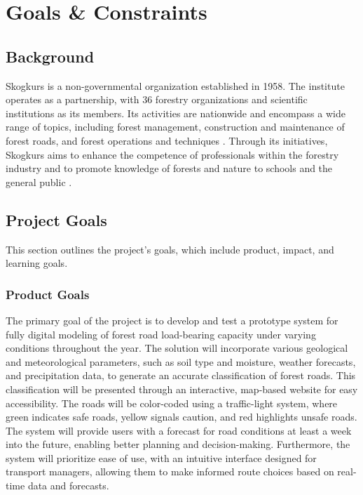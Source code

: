 \section{Goals \& Constraints}
\subsection{Background}
Skogkurs is a non-governmental organization established in 1958. The institute operates as a partnership, with 36 forestry organizations and scientific institutions as its members. Its activities are nationwide and encompass a wide range of topics, including forest management, construction and maintenance of forest roads, and forest operations and techniques \cite{skogkurs_eng}. Through its initiatives, Skogkurs aims to enhance the competence of professionals within the forestry industry and to promote knowledge of forests and nature to schools and the general public \cite{skogkurs_nor}. 


\subsection{Project Goals}
This section outlines the project's goals, which include product, impact, and learning goals.
\subsubsection{Product Goals}
The primary goal of the project is to develop and test a prototype system for fully digital modeling of forest road load-bearing capacity under varying conditions throughout the year. The solution will incorporate various geological and meteorological parameters, such as soil type and moisture, weather forecasts, and precipitation data, to generate an accurate classification of forest roads. This classification will be presented through an interactive, map-based website for easy accessibility. The roads will be color-coded using a traffic-light system, where green indicates safe roads, yellow signals caution, and red highlights unsafe roads. The system will provide users with a forecast for road conditions at least a week into the future, enabling better planning and decision-making. Furthermore, the system will prioritize ease of use, with an intuitive interface designed for transport managers, allowing them to make informed route choices based on real-time data and forecasts. 

